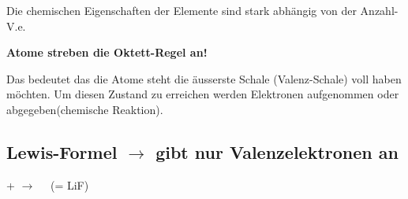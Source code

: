 Die chemischen Eigenschaften der Elemente sind stark abhängig von der Anzahl-V.e. 

\textbf{Atome streben die Oktett-Regel an!}

Das bedeutet das die Atome steht die äusserste Schale (Valenz-Schale) voll haben möchten. 
Um diesen Zustand zu erreichen werden Elektronen aufgenommen oder abgegeben(chemische Reaktion).

\subsection{Lewis-Formel $\rightarrow$ gibt nur Valenzelektronen an}
\begin{center}
     +
    $\longrightarrow$
    $\quad$(= LiF)
\end{center}
